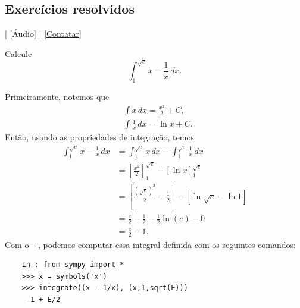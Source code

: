 \subsection*{Exercícios resolvidos}

\begin{flushright}
  [Vídeo] | [Áudio] | \href{https://phkonzen.github.io/notas/contato.html}{[Contatar]}
\end{flushright}

\begin{exeresol}
  Calcule
  \begin{equation}
    \int_1^{\sqrt{e}} x - \frac{1}{x}\,dx.
  \end{equation}
\end{exeresol}
\begin{resol}
  Primeiramente, notemos que
  \begin{align}
    & \int x\,dx = \frac{x^2}{2} + C,\\
    & \int \frac{1}{x}\,dx = \ln x + C.
  \end{align}
  Então, usando as propriedades de integração, temos
  \begin{align}
    \int_1^{\sqrt{e}} x - \frac{1}{x}\,dx &= \int_1^{\sqrt{e}} x\,dx - \int_1^{\sqrt{e}} \frac{1}{x}\,dx \\
                                 &= \left[\frac{x^2}{2}\right]_1^{\sqrt{e}} - \left[\ln x\right]_1^{\sqrt{e}} \\
                                          &= \left[\frac{(\sqrt{e})^2}{2} - \frac{1}{2}\right] - \left[\ln\sqrt{e} - \ln 1\right]\\
                                          &= \frac{e}{2} - \frac{1}{2} - \frac{1}{2}\ln(e) - 0 \\
                                          &= \frac{e}{2} - 1.
  \end{align}
  \ifispython
  Com o {\python}+{\sympy}, podemos computar essa integral definida com os seguintes comandos:
  \begin{lstlisting}
    In : from sympy import *
    >>> x = symbols('x')
    >>> integrate((x - 1/x), (x,1,sqrt(E)))
     -1 + E/2
  \end{lstlisting}
  \fi  
\end{resol}

